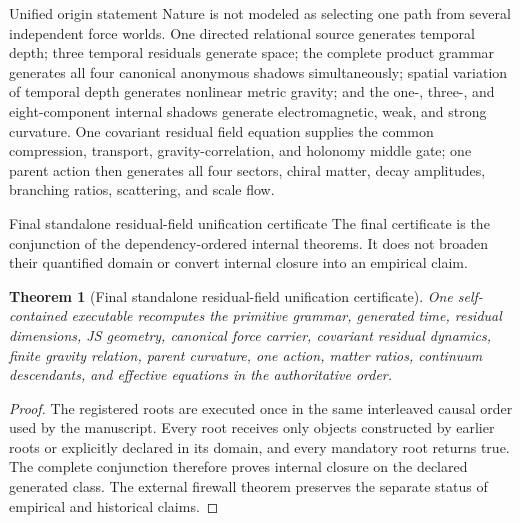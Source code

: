 \documentclass[11pt]{article}
\numberwithin{equation}{section}
\newtheorem{theorem}[definition]{Theorem}
\theoremstyle{remark}
\begin{document}
\begin{greenledger}{Unified origin statement}
Nature is not modeled as selecting one path from several independent force worlds. One directed relational source generates temporal depth; three temporal residuals generate space; the complete product grammar generates all four canonical anonymous shadows simultaneously; spatial variation of temporal depth generates nonlinear metric gravity; and the one-, three-, and eight-component internal shadows generate electromagnetic, weak, and strong curvature. One covariant residual field equation supplies the common compression, transport, gravity-correlation, and holonomy middle gate; one parent action then generates all four sectors, chiral matter, decay amplitudes, branching ratios, scattering, and scale flow.
\end{greenledger}




\begin{proofguide}{Final standalone residual-field unification certificate}
The final certificate is the conjunction of the dependency-ordered internal theorems. It does not broaden their quantified domain or convert internal closure into an empirical claim.
\end{proofguide}
\begin{theorem}[Final standalone residual-field unification certificate]
One self-contained executable recomputes the primitive grammar, generated time, residual dimensions, JS geometry, canonical force carrier, covariant residual dynamics, finite gravity relation, parent curvature, one action, matter ratios, continuum descendants, and effective equations in the authoritative order.
\end{theorem}
\begin{proof}
The registered roots are executed once in the same interleaved causal order used by the manuscript. Every root receives only objects constructed by earlier roots or explicitly declared in its domain, and every mandatory root returns true. The complete conjunction therefore proves internal closure on the declared generated class. The external firewall theorem preserves the separate status of empirical and historical claims.
\end{proof}
\appendix
\end{document}

